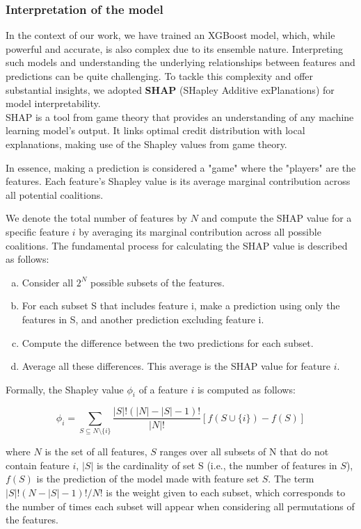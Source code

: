 \subsubsection{Interpretation of the model}
In the context of our work, we have trained an XGBoost model, which, while powerful and accurate, is also complex due to its ensemble nature. Interpreting such models and understanding the underlying relationships between features and predictions can be quite challenging. To tackle this complexity and offer substantial insights, we adopted \textbf{SHAP} (SHapley Additive exPlanations) for model interpretability. \\

SHAP is a tool from game theory that provides an understanding of any machine learning model's output. It links optimal credit distribution with local explanations, making use of the Shapley values from game theory.

In essence, making a prediction is considered a "game" where the "players" are the features. Each feature's Shapley value is its average marginal contribution across all potential coalitions.

We denote the total number of features by $N$ and compute the SHAP value for a specific feature $i$ by averaging its marginal contribution across all possible coalitions. The fundamental process for calculating the SHAP value is described as follows:

\begin{enumerate}[a.]
	\item Consider all $2^N$ possible subsets of the features.
	\item For each subset S that includes feature i, make a prediction using only the features in S, and another prediction excluding feature i.
	\item Compute the difference between the two predictions for each subset.
	\item Average all these differences. This average is the SHAP value for feature $i$.
\end{enumerate}


Formally, the Shapley value $\phi_i$ of a feature $i$ is computed as follows:

\begin{equation}
	\phi_i = \sum_{S \subseteq N \setminus \{i\}} \frac{|S|!(|N| - |S| - 1)!}{|N|!} [f(S \cup \{i\}) - f(S)]
\end{equation}


where $N$ is the set of all features, $S$ ranges over all subsets of N that do not contain feature $i$, $|S|$ is the cardinality of set S (i.e., the number of features in $S$), $f(S)$ is the prediction of the model made with feature set $S$. The term $|S|!(N - |S| - 1)! / N!$ is the weight given to each subset, which corresponds to the number of times each subset will appear when considering all permutations of the features.\\


